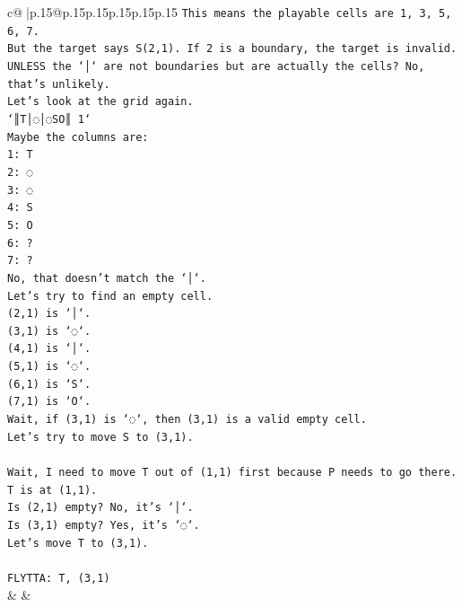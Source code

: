\documentclass{article}
\begin{document}
{\begin{supertabular}{c@{$\;$}|p{.15\linewidth}@{}p{.15\linewidth}p{.15\linewidth}p{.15\linewidth}p{.15\linewidth}p{.15\linewidth}}
{{{\texttt{This means the playable cells are 1, 3, 5, 6, 7.} \\
\texttt{But the target says S(2,1). If 2 is a boundary, the target is invalid.} \\
\texttt{UNLESS the `│` are not boundaries but are actually the cells? No, that's unlikely.} \\
\texttt{Let's look at the grid again.} \\
\texttt{`║T│◌│◌SO║ 1`} \\
\texttt{Maybe the columns are:} \\
\texttt{1: T} \\
\texttt{2: ◌} \\
\texttt{3: ◌} \\
\texttt{4: S} \\
\texttt{5: O} \\
\texttt{6: ?} \\
\texttt{7: ?} \\
\texttt{No, that doesn't match the `│`.} \\
\texttt{Let's try to find an empty cell.} \\
\texttt{(2,1) is `│`.} \\
\texttt{(3,1) is `◌`.} \\
\texttt{(4,1) is `│`.} \\
\texttt{(5,1) is `◌`.} \\
\texttt{(6,1) is `S`.} \\
\texttt{(7,1) is `O`.} \\
\texttt{Wait, if (3,1) is `◌`, then (3,1) is a valid empty cell.} \\
\texttt{Let's try to move S to (3,1).} \\
\\ 
\texttt{Wait, I need to move T out of (1,1) first because P needs to go there.} \\
\texttt{T is at (1,1).} \\
\texttt{Is (2,1) empty? No, it's `│`.} \\
\texttt{Is (3,1) empty? Yes, it's `◌`.} \\
\texttt{Let's move T to (3,1).} \\
\\ 
\texttt{FLYTTA: T, (3,1)} \\
            }
        }
    }
    & & \\ \\


\end{supertabular}}
\end{document}
